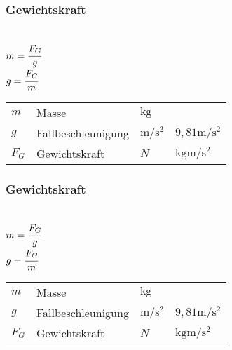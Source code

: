 \documentclass[a4paper, 11pt]{article}
\begin{document}
\subsubsection{Gewichtskraft}
\begin{minipage}{0.45\textwidth}

 \\
$m = \cfrac{F_G}{g}$ \\
$g = \cfrac{F_G}{m}$

\end{minipage}
\begin{minipage}{0.45\textwidth}

\begin{tabular}{llll}
$m$ & Masse & $\si{\kilo\gram}$ & \\
$g$ & Fallbeschleunigung & $\si{\metre\per\square\second}$ & $9,81 \si{\metre\per\square\second}$ \\
$F_G$ & Gewichtskraft & $N$ & $\si{\kilogram\metre\per\square\second}$ \\
\end{tabular}

\end{minipage}

\subsubsection{Gewichtskraft}
\begin{minipage}{0.45\textwidth}

 \\
$m = \cfrac{F_G}{g}$ \\
$g = \cfrac{F_G}{m}$

\end{minipage}
\begin{minipage}{0.45\textwidth}

\begin{tabular}{llll}
$m$ & Masse & $\si{\kilo\gram}$ & \\
$g$ & Fallbeschleunigung & $\si{\metre\per\square\second}$ & $9,81 \si{\metre\per\square\second}$ \\
$F_G$ & Gewichtskraft & $N$ & $\si{\kilogram\metre\per\square\second}$ \\
\end{tabular}

\end{minipage}
\end{document}
